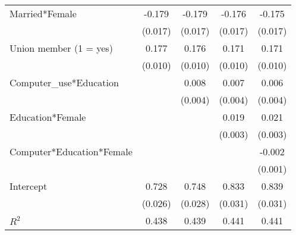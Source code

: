\begin{tabular}{l*{4}{c}}
Married*Female&      -0.179&      -0.179&      -0.176&      -0.175\\
            &     (0.017)&     (0.017)&     (0.017)&     (0.017)\\
Union member (1 = yes)&       0.177&       0.176&       0.171&       0.171\\
            &     (0.010)&     (0.010)&     (0.010)&     (0.010)\\
Computer\_use*Education&            &       0.008&       0.007&       0.006\\
            &            &     (0.004)&     (0.004)&     (0.004)\\
Education*Female&            &            &       0.019&       0.021\\
            &            &            &     (0.003)&     (0.003)\\
Computer*Education*Female&            &            &            &      -0.002\\
            &            &            &            &     (0.001)\\
Intercept   &       0.728&       0.748&       0.833&       0.839\\
            &     (0.026)&     (0.028)&     (0.031)&     (0.031)\\
\hline
\(R^{2}\)   &       0.438&       0.439&       0.441&       0.441\\
\hline\hline
\end{tabular}
